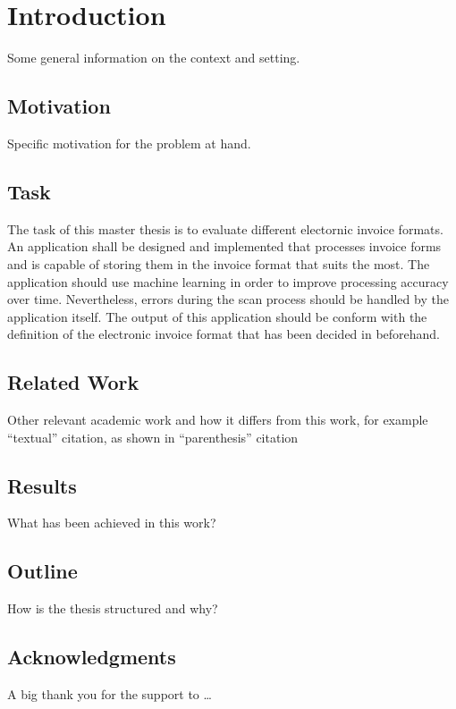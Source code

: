 %
% 

\chapter{Introduction}

Some general information on the context and setting. %


\section{Motivation}

Specific motivation for the problem at hand. %


\section{Task}

The task of this master thesis is to evaluate different electornic invoice formats. An application shall be designed and implemented that processes invoice forms and is capable of storing them in the invoice format that suits the most.
The application should use machine learning in order to improve processing accuracy over time. Nevertheless, errors during the scan process should be handled by the application itself.
The output of this application should be conform with the definition of the electronic invoice format that has been decided in beforehand.



\section{Related Work}

Other relevant academic work and how it differs from this work, for
example %
``textual'' citation, as shown in %
``parenthesis'' citation %



\section{Results}

What has been achieved in this work? %


\section{Outline}

How is the thesis structured and why? %


\section{Acknowledgments}

A big thank you for the support to \ldots %

